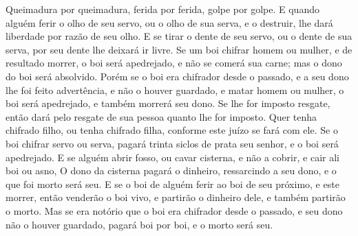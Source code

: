 {{  Queimadura por queimadura, ferida por ferida, golpe por golpe.
  E quando alguém ferir o olho de seu servo, ou o olho de sua serva, e o destruir, lhe dará liberdade por razão de seu olho.
  E se tirar o dente de seu servo, ou o dente de sua serva, por seu dente lhe deixará ir livre.
  Se um boi chifrar homem ou mulher, e de resultado morrer, o boi será apedrejado, e não se comerá sua carne; mas o dono do boi será absolvido.
  Porém se o boi era chifrador desde o passado, e a seu dono lhe foi feito advertência, e não o houver guardado, e matar homem ou mulher, o boi será apedrejado, e também morrerá seu dono.
  Se lhe for imposto resgate, então dará pelo resgate de sua pessoa quanto lhe for imposto.
  Quer tenha chifrado filho, ou tenha chifrado filha, conforme este juízo se fará com ele.
  Se o boi chifrar servo ou serva, pagará trinta siclos de prata seu senhor, e o boi será apedrejado.
  E se alguém abrir fosso, ou cavar cisterna, e não a cobrir, e cair ali boi ou asno,
  O dono da cisterna pagará o dinheiro, ressarcindo a seu dono, e o que foi morto será seu.
  E se o boi de alguém ferir ao boi de seu próximo, e este morrer, então venderão o boi vivo, e partirão o dinheiro dele, e também partirão o morto.
  Mas se era notório que o boi era chifrador desde o passado, e seu dono não o houver guardado, pagará boi por boi, e o morto será seu}.
\par }


